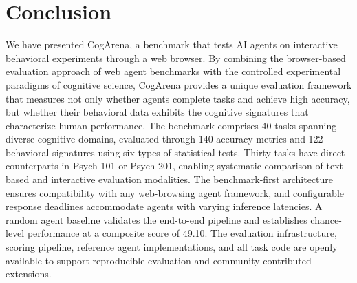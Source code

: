 \documentclass{article}
\begin{document}
\section{Conclusion}
\label{sec:conclusion}

We have presented CogArena, a benchmark that tests AI agents on interactive behavioral experiments through a web browser. By combining the browser-based evaluation approach of web agent benchmarks with the controlled experimental paradigms of cognitive science, CogArena provides a unique evaluation framework that measures not only whether agents complete tasks and achieve high accuracy, but whether their behavioral data exhibits the cognitive signatures that characterize human performance. The benchmark comprises 40 tasks spanning diverse cognitive domains, evaluated through 140 accuracy metrics and 122 behavioral signatures using six types of statistical tests. Thirty tasks have direct counterparts in Psych-101 or Psych-201, enabling systematic comparison of text-based and interactive evaluation modalities. The benchmark-first architecture ensures compatibility with any web-browsing agent framework, and configurable response deadlines accommodate agents with varying inference latencies. A random agent baseline validates the end-to-end pipeline and establishes chance-level performance at a composite score of 49.10. The evaluation infrastructure, scoring pipeline, reference agent implementations, and all task code are openly available to support reproducible evaluation and community-contributed extensions.





\newpage
\appendix

\end{document}

